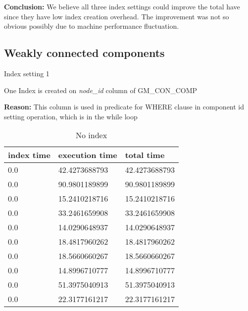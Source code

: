 \par \textbf{Conclusion:} We believe all three index settings could improve the total have since they have low index creation overhead. The improvement was not so obvious possibly due to machine performance fluctuation.

\subsection{Weakly connected components}
\begin{itemize*}
\item{Index setting 1}
\par One Index is created on \textit{node\_id} column of GM\_CON\_COMP
\par \textbf{Reason:} This column is used in predicate for WHERE clause in component id setting operation, which is in the while loop

\begin{table}[H]
\begin{center}
\begin{tabular}{|l|l|l|}
\hline
index time & execution time & total time     \\ \hline
0.0 & 42.4273688793 & 42.4273688793 \\ \hline
0.0 & 90.9801189899 & 90.9801189899 \\ \hline
0.0 & 15.2410218716 & 15.2410218716 \\ \hline
0.0 & 33.2461659908 & 33.2461659908 \\ \hline
0.0 & 14.0290648937 & 14.0290648937 \\ \hline
0.0 & 18.4817960262 & 18.4817960262 \\ \hline
0.0 & 18.5660660267 & 18.5660660267 \\ \hline
0.0 & 14.8996710777 & 14.8996710777 \\ \hline
0.0 & 51.3975040913 & 51.3975040913 \\ \hline
0.0 & 22.3177161217 & 22.3177161217 \\ \hline
\end{tabular}
\end{center}
\caption{No index}
\end{table}


\end{itemize*}
